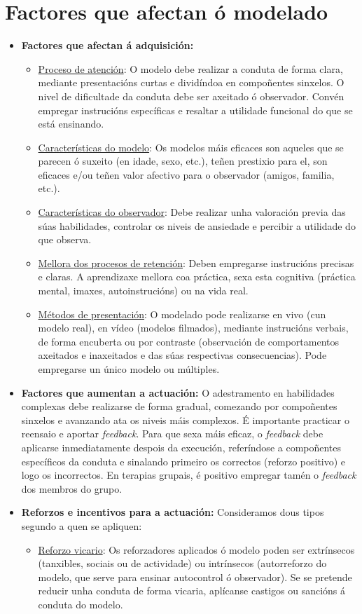 \documentclass[a4paper,11pt]{article}
\begin{document}
\section{Factores que afectan ó modelado}
\begin{itemize}
	\item \textbf{Factores que afectan á adquisición:} 
	\begin{itemize}
		\item \underline{Proceso de atención}: O modelo debe realizar a conduta de forma clara, 
		mediante presentacións curtas e dividíndoa en compoñentes sinxelos. O nivel de dificultade 	
		da conduta debe ser axeitado ó observador. Convén empregar instrucións específicas e resaltar 
		a utilidade funcional do que se está ensinando.
		\item \underline{Características do modelo}: Os modelos máis eficaces son aqueles que se 
		parecen ó suxeito (en idade, sexo, etc.), teñen prestixio para el, son eficaces e/ou teñen 
		valor afectivo para o observador (amigos, familia, etc.). 
		\item \underline{Características do observador}: Debe realizar unha valoración previa das 
		súas habilidades, controlar os niveis de ansiedade e percibir a utilidade do que observa.
		\item \underline{Mellora dos procesos de retención}: Deben empregarse instrucións precisas e 
		claras. A aprendizaxe mellora coa práctica, sexa esta cognitiva (práctica mental, imaxes, 
		autoinstrucións) ou na vida real.
		\item \underline{Métodos de presentación}: O modelado pode realizarse en vivo (cun modelo 
		real), en vídeo (modelos filmados), mediante instrucións verbais, de forma encuberta ou por 
		contraste (observación de comportamentos axeitados e inaxeitados e das súas respectivas 
		consecuencias). Pode empregarse un único modelo ou múltiples. 
	\end{itemize}
	\item \textbf{Factores que aumentan a actuación:} O adestramento en habilidades complexas debe 
	realizarse de forma gradual, comezando por compoñentes sinxelos e avanzando ata os niveis máis 
	complexos. É importante practicar o reensaio e aportar \textit{feedback}. Para que sexa máis 
	eficaz, o \textit{feedback} debe aplicarse inmediatamente despois da execución, referíndose a 
	compoñentes específicos da conduta e sinalando primeiro os correctos (reforzo positivo) e logo 
	os incorrectos. En terapias grupais, é positivo empregar tamén o \textit{feedback} dos membros do 
	grupo. 
	\item \textbf{Reforzos e incentivos para a actuación:} Consideramos dous tipos segundo a quen se 
	apliquen:
	\begin{itemize}
		\item \underline{Reforzo vicario}: Os reforzadores aplicados ó modelo poden ser extrínsecos 
		(tanxibles, sociais ou de actividade) ou intrínsecos (autorreforzo do modelo, que serve para 
		ensinar autocontrol ó observador). Se se pretende reducir unha conduta de forma vicaria, 
		aplícanse castigos ou sancións á conduta do modelo.
		

\end{itemize}
\end{itemize}
\end{document}
